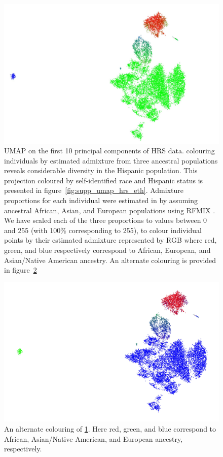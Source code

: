 \documentclass[12pt]{pnas-new}
\begin{document}
\begin{figure}
\centering
   \includegraphics[width=0.6\linewidth]{images/HRS_1000G_NP1_UMAP_PC10_NC2_NN15_MD05_pca_1kgp_onto_hrs_umap_1kgp_onto_hrs_2018112221116_admix.pdf}
   \caption{UMAP on the first 10 principal components of HRS data. colouring individuals by estimated admixture from three ancestral populations reveals considerable diversity in the Hispanic population. This projection coloured by self-identified race and Hispanic status is presented in figure~\ref{fig:supp_umap_hrs_eth}. Admixture proportions for each individual were estimated in \cite{baharian2016great} by assuming ancestral African, Asian, and European populations using RFMIX \cite{Maples:2013fia}. We have scaled each of the three proportions to values between 0 and 255 (with 100\% corresponding to 255), to colour individual points by their estimated admixture represented by RGB where red, green, and blue respectively correspond to African, European, and Asian/Native American ancestry. An alternate colouring is provided in figure~\ref{fig:umap_hrs_admix_alt}}
    \label{fig:umap_hrs_admix}
\end{figure}

\begin{figure}
\centering
   \includegraphics[width=0.6\linewidth]{images/HRS_1000G_NP1_UMAP_PC10_NC2_NN15_MD05_pca_1kgp_onto_hrs_umap_1kgp_onto_hrs_2018112221116_admix132.jpeg}
   \caption{An alternate colouring of \ref{fig:umap_hrs_admix}. Here red, green, and blue correspond to African, Asian/Native American, and European ancestry, respectively.}
    \label{fig:umap_hrs_admix_alt}
\end{figure}
\end{document}
